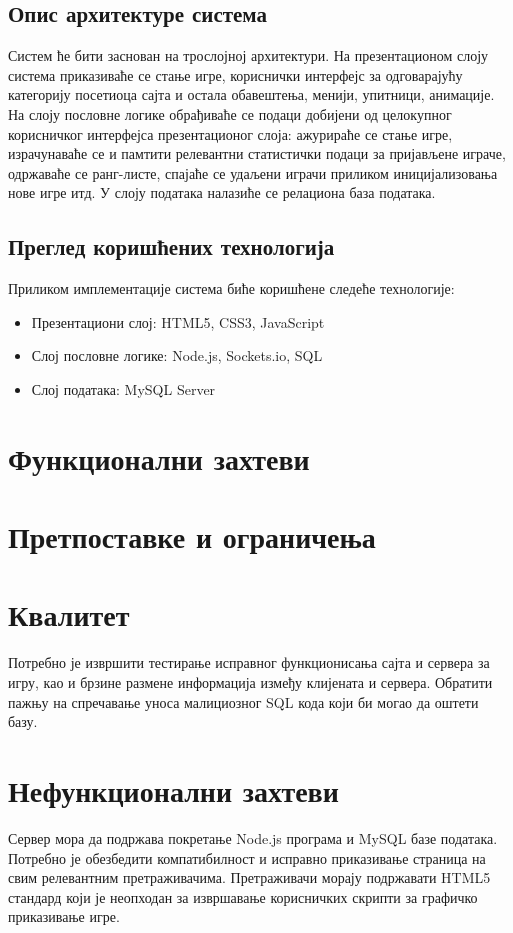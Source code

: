 \subsection{Опис архитектуре система}
Систем ће бити заснован на трослојној архитектури. На презентационом слоју система приказиваће се стање игре, кориснички интерфејс за одговарајућу категорију посетиоца сајта и остала обавештења, менији, упитници, анимације. На слоју пословне логике обрађиваће се подаци добијени од целокупног корисничког интерфејса презентационог слоја: ажурираће се стање игре, израчунаваће се и памтити релевантни статистички подаци за пријављене играче, одржаваће се ранг-листе, спајаће се удаљени играчи приликом иницијализовања нове игре итд. У слоју података налазиће се релациона база података.

\subsection{Преглед коришћених технологија}
Приликом имплементације система биће коришћене следеће технологије:
\begin{itemize}
    \item Презентациони слој: HTML5, CSS3, JavaScript
    \item Слој пословне логике: Node.js, Sockets.io, SQL
    \item Слој података: MySQL Server
\end{itemize}

\section{Функционални захтеви} 

\section{Претпоставке и ограничења}

\section{Квалитет}
Потребно је извршити тестирање исправног функционисања сајта и сервера за игру, као и брзине размене информација између клијената и сервера. Обратити пажњу на спречавање уноса малициозног SQL кода који би могао да оштети базу.

\section{Нефункционални захтеви}
Сервер мора да подржава покретање Node.js програма и MySQL базе података. Потребно је обезбедити компатибилност и исправно приказивање страница на свим релевантним претраживачима. Претраживачи морају подржавати HTML5 стандард који је неопходан за извршавање корисничких скрипти за графичко приказивање игре.

